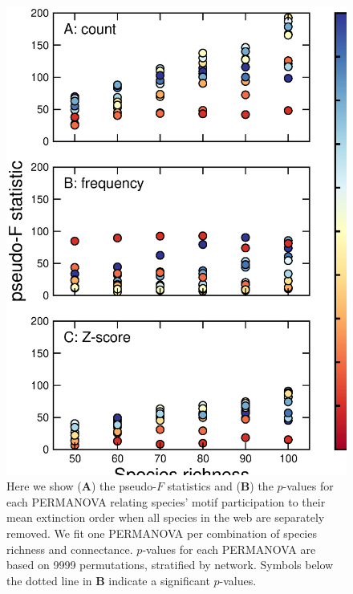 \documentclass[12pt]{article}
\begin{document}
\begin{spacing}{2.0}
		\begin{figure}[h!]
			\caption{Here we show (\textbf{A}) the pseudo-$F$ statistics and (\textbf{B}) the $p$-values for each PERMANOVA relating species' motif participation to their mean extinction order when all species in the web are separately removed. We fit one PERMANOVA per combination of species richness and connectance. $p$-values for each PERMANOVA are based on 9999 permutations, stratified by network. Symbols below the dotted line in \textbf{B} indicate a significant $p$-values. }
			\label{permfig}
			\includegraphics[height=.65\textheight]{figures/extinction_order/permanova_summary.eps}
			\end{figure}



\end{spacing}
\end{document}
